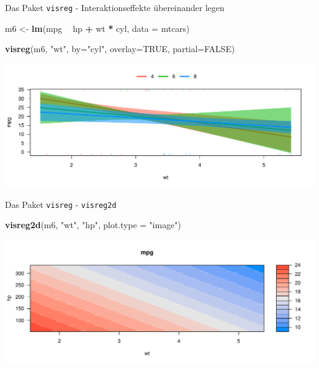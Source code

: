 \documentclass[ignorenonframetext,]{beamer}
\newenvironment{Shaded}{\begin{snugshade}}{\end{snugshade}}
\newcommand{\KeywordTok}[1]{\textcolor[rgb]{0.13,0.29,0.53}{\textbf{#1}}}
\newcommand{\DataTypeTok}[1]{\textcolor[rgb]{0.13,0.29,0.53}{#1}}
\newcommand{\StringTok}[1]{\textcolor[rgb]{0.31,0.60,0.02}{#1}}
\newcommand{\OtherTok}[1]{\textcolor[rgb]{0.56,0.35,0.01}{#1}}
\newcommand{\OperatorTok}[1]{\textcolor[rgb]{0.81,0.36,0.00}{\textbf{#1}}}
\newcommand{\NormalTok}[1]{#1}
\begin{document}
\begin{frame}[fragile]{Das Paket \texttt{visreg} - Interaktionseffekte
übereinander legen}

\begin{Shaded}
\begin{Highlighting}[]
\NormalTok{m6 <-}\StringTok{ }\KeywordTok{lm}\NormalTok{(mpg }\OperatorTok{~}\StringTok{ }\NormalTok{hp }\OperatorTok{+}\StringTok{ }\NormalTok{wt }\OperatorTok{*}\StringTok{ }\NormalTok{cyl, }\DataTypeTok{data =}\NormalTok{ mtcars)}
\end{Highlighting}
\end{Shaded}

\begin{Shaded}
\begin{Highlighting}[]
\KeywordTok{visreg}\NormalTok{(m6, }\StringTok{"wt"}\NormalTok{, }\DataTypeTok{by=}\StringTok{"cyl"}\NormalTok{, }\DataTypeTok{overlay=}\OtherTok{TRUE}\NormalTok{, }\DataTypeTok{partial=}\OtherTok{FALSE}\NormalTok{)}
\end{Highlighting}
\end{Shaded}

\includegraphics{B3_linreg_files/figure-beamer/unnamed-chunk-42-1.pdf}

\end{frame}

\begin{frame}[fragile]{Das Paket \texttt{visreg} - \texttt{visreg2d}}

\begin{Shaded}
\begin{Highlighting}[]
\KeywordTok{visreg2d}\NormalTok{(m6, }\StringTok{"wt"}\NormalTok{, }\StringTok{"hp"}\NormalTok{, }\DataTypeTok{plot.type =} \StringTok{"image"}\NormalTok{)}
\end{Highlighting}
\end{Shaded}

\includegraphics{B3_linreg_files/figure-beamer/unnamed-chunk-43-1.pdf}

\end{frame}
\end{document}
